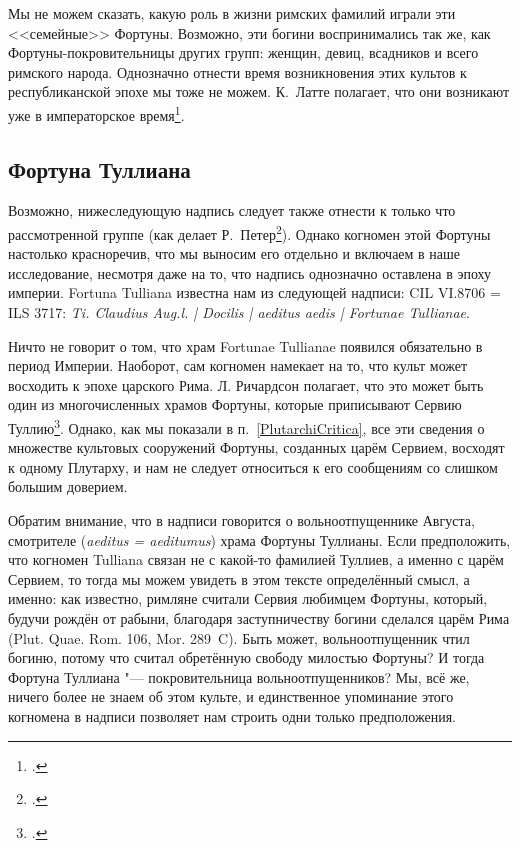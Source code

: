 Мы не можем сказать, какую роль в жизни римских фамилий играли эти <<семейные>> Фортуны. Возможно, эти богини воспринимались так же, как Фортуны-покровительницы других групп: женщин, девиц, всадников и всего римского народа. Однозначно отнести время возникновения этих культов к республиканской эпохе мы тоже не можем. К.~Латте полагает, что они возникают уже в императорское время\footcite[S. 182]{Latte1960}.

\subsection{Фортуна Туллиана}\label{FortunaTulliana}

Возможно, нижеследующую надпись следует также отнести к только что рассмотренной группе (как делает Р.~Петер\footcite[Sp. 1521]{Peter1890Fortuna}). Однако когномен этой Фортуны настолько красноречив, что мы выносим его отдельно и включаем в наше исследование, несмотря даже на то, что надпись однозначно оставлена в эпоху империи. Fortuna Tulliana известна нам из следующей надписи: CIL VI.8706 = ILS 3717: \textit{Ti. Claudius Aug.l. | Docilis | aeditus aedis | Fortunae Tullianae}.

Ничто не говорит о том, что храм Fortunae Tullianae появился обязательно в период Империи. Наоборот, сам когномен намекает на то, что культ может восходить к эпохе царского Рима. Л. Ричардсон полагает, что это может быть один из многочисленных храмов Фортуны, которые приписывают Сервию Туллию\footcite[P. 158]{Richardson1992}. Однако, как мы показали в п.~\ref{PlutarchiCritica}, все эти сведения о множестве культовых сооружений Фортуны, созданных царём Сервием, восходят к одному Плутарху, и нам не следует относиться к его сообщениям со слишком большим доверием.

Обратим внимание, что в надписи говорится о вольноотпущеннике Августа, смотрителе (\textit{aeditus = aeditumus}) храма Фортуны Туллианы. Если предположить, что когномен Tulliana связан не с какой-то фамилией Туллиев, а именно с царём Сервием, то тогда мы можем увидеть в этом тексте определённый смысл, а именно: как известно, римляне считали Сервия любимцем Фортуны, который, будучи рождён от рабыни, благодаря заступничеству богини сделался царём Рима (Plut. Quae. Rom. 106, Mor. 289~C). Быть может, вольноотпущенник чтил богиню, потому что считал обретённую свободу милостью Фортуны? И тогда Фортуна Туллиана "--- покровительница вольноотпущенников? Мы, всё же, ничего более не знаем об этом культе, и единственное упоминание этого когномена в надписи позволяет нам строить одни только предположения.

